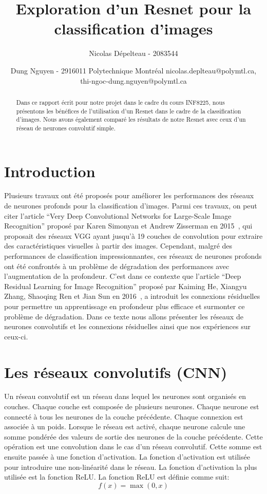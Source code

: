 \documentclass{article}
\title{Exploration d'un Resnet pour la classification d'images}
\author{
Nicolas Dépelteau - 2083544
\and
Dung Nguyen - 2916011
\affiliations{}
Polytechnique Montréal
\emails{}
nicolas.deplteau@polymtl.ca,
thi-ngoc-dung.nguyen@polymtl.ca
}
\begin{document}
\maketitle

\begin{abstract}
    Dans ce rapport écrit pour notre projet dans le cadre du cours INF8225,
    nous présentons les bénéfices de l'utilisation
    d'un Resnet dans le cadre de la classification d'images. Nous avons également comparé les
    résultats de notre Resnet avec ceux d'un réseau de neurones convolutif simple. 
\end{abstract}

\section{Introduction}

Plusieurs travaux ont été proposés pour améliorer les performances des réseaux de neurones profonds pour la classification d'images.
Parmi ces travaux, on peut citer l'article ``Very Deep Convolutional Networks for Large-Scale Image Recognition'' proposé par Karen
Simonyan et Andrew Zisserman en 2015~\cite{simonyan2015deep}, qui proposait des réseaux VGG ayant jusqu'à 19 couches de convolution pour extraire des
caractéristiques visuelles à partir des images.
Cependant, malgré des performances de classification impressionnantes, ces réseaux de neurones profonds ont été confrontés à un
problème de dégradation des performances avec l'augmentation de la profondeur.
C'est dans ce contexte que l'article ``Deep Residual Learning for Image Recognition'' proposé par Kaiming He, Xiangyu Zhang,
Shaoqing Ren et Jian Sun en 2016~\cite{resnet}, a introduit les connexions résiduelles pour permettre un apprentissage en profondeur plus efficace
et surmonter ce problème de dégradation.
Dans ce texte nous allons présenter les réseaux de neurones convolutifs et les connexions résiduelles ainsi que nos expériences
sur ceux-ci.

\section{Les réseaux convolutifs (CNN)}
Un réseau convolutif est un réseau dans lequel les neurones sont organisés en couches.
Chaque couche est composée de plusieurs neurones. Chaque neurone est connecté à tous les neurones de la couche précédente.
Chaque connexion est associée à un poids. Lorsque le réseau est activé, chaque neurone calcule une somme
pondérée des valeurs de sortie des neurones de la couche précédente.
Cette opération est une convolution dans le cas d'un réseau convolutif.
Cette somme est ensuite passée à une fonction d'activation.
La fonction d'activation est utilisée pour introduire une non-linéarité dans le réseau.
La fonction d'activation la plus utilisée est la fonction ReLU.\@
La fonction ReLU est définie comme suit:
\begin{equation}
    f(x) = \max(0, x)
\end{equation}
\end{document}
